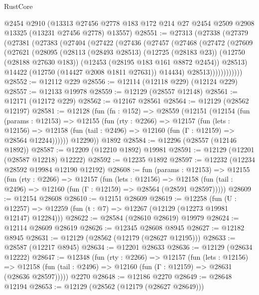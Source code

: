 \begin{lexlean}{RustCore}
\begin{coremodule}
    @2454
    @2910
    (@13313 @27456 @2778 @183 @172 @214 @27 @2454 @2509 @2908 @13325 (@13231 @27456 @2778) @13557)
@28551 := @27313
    (@27338
      (@27379
        (@27381
          (@27383
            (@27404
              (@27422
                (@27436
                  (@27457
                    (@27468
                      (@27472
                        (@27609
                          (@27621
                            (@28095
                              (@28113
                                (@28493 @28513)
                                (@12725 (@28183 @23))
                                (@12750 (@28188 @27630 @183))
                                (@12453 (@28195 @183 @161 @8872 @2454))
                                @28513)
                              @14422
                              (@12750 (@14427 @2008 @1811 @27631))
                              @14434)
                            @28513))))))))))))
@28552 := @12112 @229
@28556 := @12114 (@12118 @229) (@12124 @229)
@28557 := @12133 @19978
@28559 := @12129 (@28557 @12148)
@28561 := @12171 (@12172 @229)
@28562 := @12167 @28561
@28564 := @12129 (@28562 @12197)
@28581 := @12128
    (fun (fn : @152) =>
    @28559
      (@12151
        (@12154
          (fun (params : @12153) =>
          @12155
            (fun (rty : @2266) =>
            @12157
              (fun (lets : @12156) =>
              @12158 (fun (tail : @2496) => @12160 (fun (Γ : @12159) => @28564 @12244))))))
        @12290))
    @1892
@28584 := @12296 (@28557 (@12146 @1892))
@28587 := @12209 (@12210 @1892) @19981
@28591 := @12129 (@12201 (@28587 @12218) @12222)
@28592 := @12235 @1892
@28597 := @12232 (@12234 @28592 @19984 @12190 @12192)
@28608 := fun (params : @12153) =>
  @12155
    (fun (rty : @2266) =>
    @12157
      (fun (lets : @12156) =>
      @12158 (fun (tail : @2496) => @12160 (fun (Γ : @12159) => @28564 (@28591 @28597)))))
@28609 := @12154 @28608
@28610 := @12151 @28609
@28619 := @12258
    (fun (U : @12257) => @12259 (fun (t : @7) => @12267 (@12129 (@12273 @19981 @12147) @12284)))
@28622 := @28584 (@28610 @28619) @19979
@28624 := @12114 @28609 @28619
@28626 := @12345 @28608 @8945
@28627 := @12182 @8945
@28631 := @12129 (@28562 (@12179 (@28627 @12195)))
@28633 := @28587 (@12217 @8945)
@28634 := @12201 @28633
@28636 := @12129 (@28634 @12222)
@28647 := @12348
    (fun (rty : @2266) =>
    @12157
      (fun (lets : @12156) =>
      @12158 (fun (tail : @2496) => @12160 (fun (Γ : @12159) => @28631 (@28636 @28597)))))
    @2270
@28648 := @12186 @2270
@28649 := @28648 @12194
@28653 := @12129 (@28562 (@12179 (@28627 @28649)))

\end{coremodule}
\end{lexlean}
